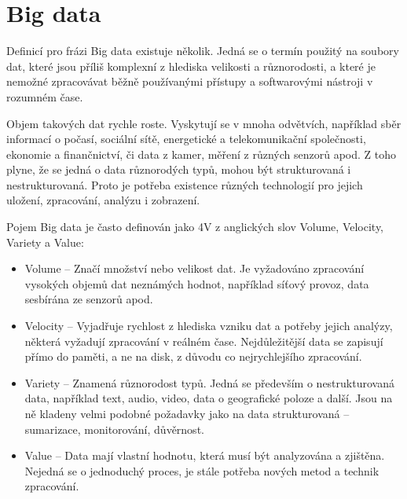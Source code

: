 \section{Big data} \label{bigDataSection}
Definicí pro frázi Big data existuje několik. Jedná se o termín použitý na soubory dat, které jsou příliš komplexní z hlediska velikosti a různorodosti, a které je nemožné zpracovávat běžně používanými přístupy a softwarovými nástroji v rozumném čase.

Objem takových dat rychle roste. Vyskytují se v mnoha odvětvích, například sběr informací o počasí, sociální sítě, energetické a telekomunikační společnosti, ekonomie a finančnictví, či data z kamer, měření z různých senzorů apod. Z toho plyne, že se jedná o data různorodých typů, mohou být strukturovaná i nestrukturovaná. Proto je potřeba existence různých technologií pro jejich uložení, zpracování, analýzu i zobrazení.


\vspace{0.5cm}

\noindent Pojem Big data je často definován jako 4V z anglických slov Volume, Velocity, Variety a Value: \cite{oracleBigData}

\begin{itemize}
\item Volume – Značí množství nebo velikost dat. Je vyžadováno zpracování vysokých objemů dat neznámých hodnot, například síťový provoz, data sesbírána ze senzorů apod.

\item Velocity – Vyjadřuje rychlost z hlediska vzniku dat a potřeby jejich analýzy, některá vyžadují zpracování v reálném čase. Nejdůležitější data se zapisují přímo do paměti, a ne na disk, z důvodu co nejrychlejšího zpracování.

\item Variety – Znamená různorodost typů. Jedná se především o nestrukturovaná data, například text, audio, video, data o geografické poloze a další. Jsou na ně kladeny velmi podobné požadavky jako na data strukturovaná – sumarizace, monitorování, důvěrnost. \cite{oracleBigData}

\item Value – Data mají vlastní hodnotu, která musí být analyzována a zjištěna. Nejedná se o jednoduchý proces, je stále potřeba nových metod a technik zpracování.
\end{itemize}


